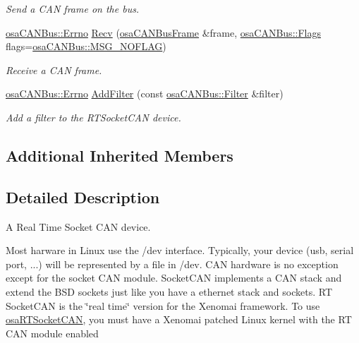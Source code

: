 \begin{DoxyCompactItemize}
\begin{DoxyCompactList}\small\item\em Send a C\-A\-N frame on the bus. \end{DoxyCompactList}\item 
\hyperlink{classosa_c_a_n_bus_a6fa3e95ec4c36932d0640e40e0748fde}{osa\-C\-A\-N\-Bus\-::\-Errno} \hyperlink{classosa_r_t_socket_c_a_n_ad48837c43d6cd6575aa49c1b9959561f}{Recv} (\hyperlink{classosa_c_a_n_bus_frame}{osa\-C\-A\-N\-Bus\-Frame} \&frame, \hyperlink{classosa_c_a_n_bus_a74fe35c6059237887431f3ccece7b21b}{osa\-C\-A\-N\-Bus\-::\-Flags} flags=\hyperlink{classosa_c_a_n_bus_a74fe35c6059237887431f3ccece7b21ba30f701fa6e0dba6e274540941ccd3978}{osa\-C\-A\-N\-Bus\-::\-M\-S\-G\-\_\-\-N\-O\-F\-L\-A\-G})
\begin{DoxyCompactList}\small\item\em Receive a C\-A\-N frame. \end{DoxyCompactList}\item 
\hyperlink{classosa_c_a_n_bus_a6fa3e95ec4c36932d0640e40e0748fde}{osa\-C\-A\-N\-Bus\-::\-Errno} \hyperlink{classosa_r_t_socket_c_a_n_a3a96bca01aa133ada72df390789bf3a4}{Add\-Filter} (const \hyperlink{classosa_c_a_n_bus_1_1_filter}{osa\-C\-A\-N\-Bus\-::\-Filter} \&filter)
\begin{DoxyCompactList}\small\item\em Add a filter to the R\-T\-Socket\-C\-A\-N device. \end{DoxyCompactList}\end{DoxyCompactItemize}
\subsection*{Additional Inherited Members}


\subsection{Detailed Description}
A Real Time Socket C\-A\-N device. 

Most harware in Linux use the /dev interface. Typically, your device (usb, serial port, ...) will be represented by a file in /dev. C\-A\-N hardware is no exception except for the socket C\-A\-N module. Socket\-C\-A\-N implements a C\-A\-N stack and extend the B\-S\-D sockets just like you have a ethernet stack and sockets. R\-T Socket\-C\-A\-N is the \char`\"{}real time\char`\"{} version for the Xenomai framework. To use \hyperlink{classosa_r_t_socket_c_a_n}{osa\-R\-T\-Socket\-C\-A\-N}, you must have a Xenomai patched Linux kernel with the R\-T C\-A\-N module enabled 

